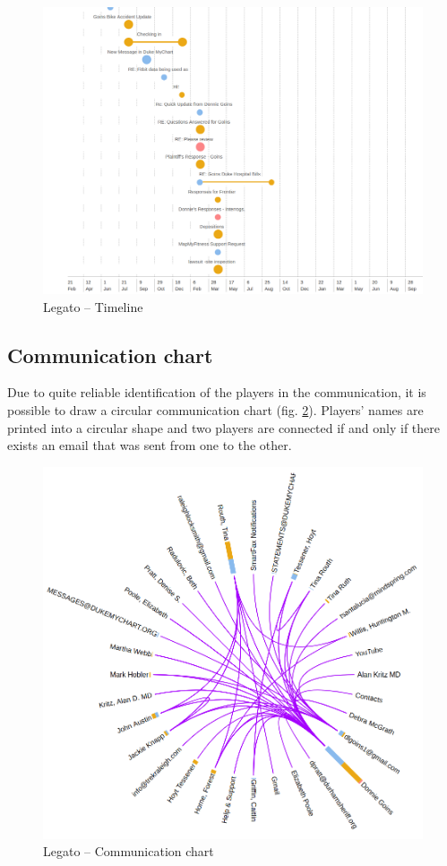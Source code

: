 \documentclass[
  digital, %
  notable,   %
  nolof,     %
  nolot,     %
]{fithesis3}
\begin{document}
\begin{figure}[h]
\caption{Legato -- Timeline}
\label{fig:legato_timeline}
\includegraphics[width=\textwidth]{img/Legato-Timeline}
\end{figure}

\subsection*{Communication chart}
Due to quite reliable identification of the players in the communication, it is possible to draw a circular communication chart (fig. \ref{fig:legato_communication}).
Players' names are printed into a circular shape and two players are connected if and only if there exists an email that was sent from one to the other.

\begin{figure}[h]
\caption{Legato -- Communication chart}
\label{fig:legato_communication}
\includegraphics[width=\textwidth]{img/Legato-Communication}
\end{figure}
\end{document}
